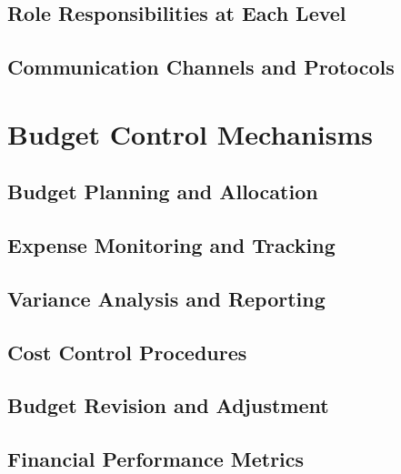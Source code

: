 \subsection{Role Responsibilities at Each Level}

\subsection{Communication Channels and Protocols}

\section{Budget Control Mechanisms}

\subsection{Budget Planning and Allocation}

\subsection{Expense Monitoring and Tracking}

\subsection{Variance Analysis and Reporting}

\subsection{Cost Control Procedures}

\subsection{Budget Revision and Adjustment}

\subsection{Financial Performance Metrics}

